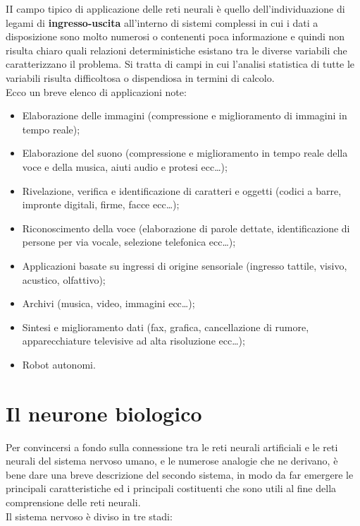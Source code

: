 \documentclass[12pt,a4paper,oneside]{book}
\begin{document}
		II campo tipico di applicazione delle reti neurali è quello dell'individuazione di legami di \textbf{ingresso-uscita} all'interno di sistemi complessi in cui i dati a disposizione sono molto 
		numerosi o contenenti poca informazione e quindi non risulta chiaro quali relazioni deterministiche esistano tra le diverse variabili che caratterizzano il problema. Si tratta di campi in cui l'analisi statistica di tutte le variabili risulta difficoltosa o dispendiosa in termini di calcolo.\\ 
		Ecco un breve elenco di applicazioni note:
		
		\begin{itemize}
			\item Elaborazione delle immagini (compressione e miglioramento di immagini in tempo reale);
			\item Elaborazione del suono (compressione e miglioramento in tempo reale della voce e della musica, aiuti audio e protesi ecc\dots);
			\item Rivelazione, verifica e identificazione di caratteri e oggetti (codici a barre, impronte digitali, firme, facce ecc\dots );  
			\item Riconoscimento della voce (elaborazione di parole dettate, identificazione di persone per via vocale, selezione telefonica ecc\dots );
			\item Applicazioni basate su ingressi di origine sensoriale (ingresso tattile, visivo, acustico, olfattivo);
			\item Archivi (musica, video, immagini ecc\dots);
			\item Sintesi e miglioramento dati (fax, grafica, cancellazione di rumore, apparecchiature televisive ad alta risoluzione ecc\dots);
			\item Robot autonomi.
		\end{itemize}

		
		

	\section{Il neurone biologico}
		
		Per convincersi a fondo sulla connessione tra le reti neurali artificiali e le reti neurali del sistema nervoso umano, e le numerose analogie che ne derivano, è bene dare una breve descrizione del secondo sistema, in modo da far emergere le principali caratteristiche ed i principali costituenti che sono utili al fine della comprensione delle reti neurali.\\
  		Il sistema nervoso è diviso in tre stadi:
		
\end{document}
